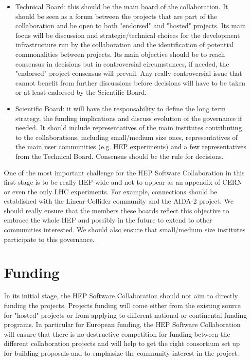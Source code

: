 \documentclass[11pt]{article} %
\begin{document}
\begin{itemize}

\item Technical Board: this should be the main board of the collaboration. It should be seen as a forum between the projects that are part
of the collaboration and be open to both "endorsed" and "hosted" projects. Its main focus will be discussion and strategic/technical choices for 
the development infrastructure run by the collaboration and the identification of potential commonalities between projects. Its main objective should
be to reach consensus in decisions but in controversial circumstances, if needed, the "endorsed" project consensus will prevail. Any really controversial
issue that cannot benefit from further discussions before decisions will have to be taken or at least endorsed by the Scientific Board.

\item Scientific Board: it will have the responsability to define the long term strategy, the funding implications and discuss evolution of the governance if
needed. It should include representatives of the main institutes contributing to the collaborations, including small/medium size ones, representatives of the main
user communities (e.g. HEP experiments) and a few representatives from the Technical Board. Consensus should be the rule for decisions.

\end{itemize}

One of the most important challenge for the HEP Software Collaboration in this first stage is to be really HEP-wide and not
to appear as an appendix of CERN or even the only LHC experiments. For example, connections should be established with the Linear Collider
community and the AIDA-2 project. We should really ensure that the members these boards reflect this objective to embrace the whole HEP
and possibly in the future to extend to other communities interested. We should also ensure that small/medium size institutes participate
to this governance.


\section{Funding}

In its initial stage, the HEP Software Collaboration should not aim to directly funding the projects. Projects funding will come
either from the existing source for "hosted" projects or from applying to different national or continental funding programs. In
particular for European funding, the HEP Software Collaboration will ensure that there is no destructive competition for funding
between the different collaboration projects and will help to get the right consortium set up for building proposals and to emphasize 
the community interest in the project.
\end{document}
